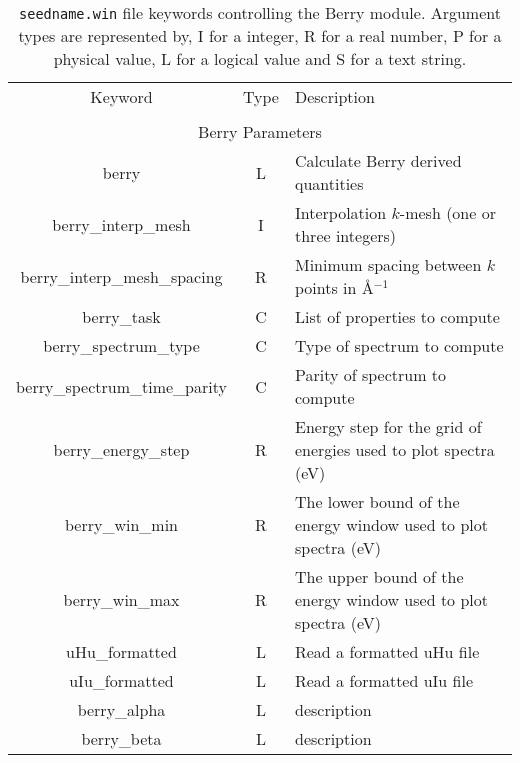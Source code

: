 \begin{table}[hH!]
\begin{center}
\begin{tabular}{|c|c|p{6cm}|}
\hline
Keyword & Type & Description \\
        &      &             \\
\hline\hline
\multicolumn{3}{|c|}{Berry Parameters} \\
\hline
{\sc berry}  & L & Calculate Berry derived quantities \\
{\sc berry\_interp\_mesh} & I & Interpolation $k$-mesh (one or three integers)\\ 
{\sc berry\_interp\_mesh\_spacing}& R & Minimum spacing between $k$ points in \AA$^{-1}$\\
{\sc berry\_task}& C  & List of properties to compute \\
{\sc berry\_spectrum\_type}& C & Type of spectrum to compute\\
{\sc berry\_spectrum\_time\_parity}& C & Parity of spectrum to compute\\ 
{\sc berry\_energy\_step}& R & Energy step for the grid of energies
used to plot spectra (eV)\\
{\sc berry\_win\_min} & R & The lower bound of the energy window used
to plot spectra (eV) \\
{\sc berry\_win\_max}& R & The upper bound of the energy window used
to plot spectra (eV) \\
{\sc uHu\_formatted}& L & Read a formatted uHu file \\
{\sc uIu\_formatted}& L & Read a formatted uIu file\\
{\sc berry\_alpha}& L & description\\
{\sc berry\_beta}& L & description\\
\hline
\end{tabular}
\caption[Parameter file keywords controlling the Berry module.]
{{\tt seedname.win} file keywords controlling the Berry module. Argument types
are represented by, I for a integer, R for a real number, P for a
physical value, L for a logical value and S for a text string.}
\label{parameter_keywords_berry}
\end{center}
\end{table}



